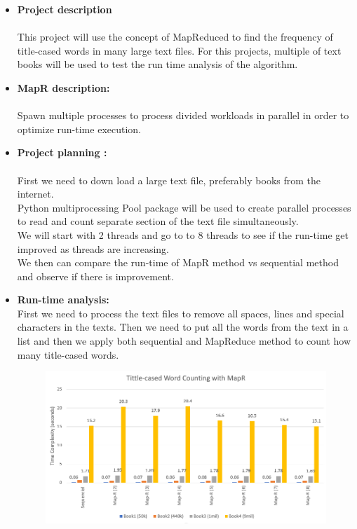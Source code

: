 \documentclass[12pt]{article}
\newcommand\tab[1][0.6cm]{\hspace*{#1}}
\begin{document}
    \begin{itemize}
    \item \textbf{Project description}\\\\
    \tab This project will use the concept of MapReduced to find the frequency of title-cased words in many large text files. For this projects, multiple of text books will be used to test the run time analysis of the algorithm.
    
    \item \textbf{MapR description: }\\\\
    \tab Spawn multiple processes to process divided workloads in parallel in order to optimize run-time execution.  
    \item \textbf{Project planning : }\\\\
    \tab First we need to down load a large text file, preferably books from the internet.\\
    \tab Python multiprocessing Pool package will be used to create parallel processes to read and count separate section of the text file simultaneously. \\
    \tab We will start with 2 threads and go to to 8 threads to see if the run-time get improved as threads are increasing. \\
    \tab We then can compare the run-time of MapR method vs sequential method and observe if there is improvement. 
	\item \textbf{Run-time analysis:} \\
	\tab First we need to process the text files to remove all spaces, lines and special characters in the texts. Then we need to put all the words from the text in a list and then we apply both sequential and MapReduce method to count how many title-cased words. 
	\begin{figure}[H]
    	\centering
    	\includegraphics[width=15cm]{analysis1.png}

\end{figure}
\end{itemize}
\end{document}
